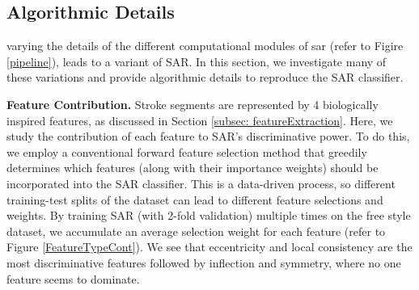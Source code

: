 \vspace{-2mm}
\subsection{Algorithmic Details} \label{subsec:variations}
\vspace{-2mm}
varying the details of the different computational modules of sar (refer to Figire \ref{pipeline}), leads to a variant of SAR. In this section, we investigate many of these variations and provide algorithmic details to reproduce the SAR classifier.


\noindent\textbf{Feature Contribution.} Stroke segments are represented by 4 biologically inspired features, as discussed in Section \ref{subsec: featureExtraction}. Here, we study the contribution of each feature to SAR's discriminative power. To do this, we employ a conventional forward feature selection method that greedily determines which features (along with their importance weights) should be incorporated into the SAR classifier. This is a data-driven process, so different training-test splits of the dataset can lead to different feature selections and weights. By training SAR (with 2-fold validation) multiple times on the free style dataset, we accumulate an average selection weight for each feature (refer to Figure \ref{FeatureTypeCont}). We see that eccentricity and local consistency are the most discriminative features followed by inflection and symmetry, where no one feature seems to dominate.


